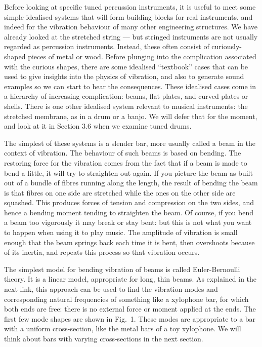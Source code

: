 

  Before looking at specific tuned percussion instruments, it is useful to meet 
  some simple idealised systems that will form building blocks for real 
  instruments, and indeed for the vibration behaviour of many other engineering 
  structures. We have already looked at the stretched string --- but stringed 
  instruments are not usually regarded as percussion instruments. Instead, 
  these often consist of curiously-shaped pieces of metal or wood. Before 
  plunging into the complication associated with the curious shapes, there are 
  some idealised ``textbook'' cases that can be used to give insights into the 
  physics of vibration, and also to generate sound examples so we can start to 
  hear the consequences. These idealised cases come in a hierarchy of 
  increasing complication: beams, flat plates, and curved plates or shells. 
  There is one other idealised system relevant to musical instruments: the 
  stretched membrane, as in a drum or a banjo. We will defer that for the 
  moment, and look at it in Section 3.6 when we examine tuned drums. 

  The simplest of these systems is a slender bar, more usually called a beam in 
  the context of vibration. The behaviour of such beams is based on bending. 
  The restoring force for the vibration comes from the fact that if a beam is 
  made to bend a little, it will try to straighten out again. If you picture 
  the beam as built out of a bundle of fibres running along the length, the 
  result of bending the beam is that fibres on one side are stretched while the 
  ones on the other side are squashed. This produces forces of tension and 
  compression on the two sides, and hence a bending moment tending to 
  straighten the beam. Of course, if you bend a beam too vigorously it may 
  break or stay bent: but this is not what you want to happen when using it to 
  play music. The amplitude of vibration is small enough that the beam springs 
  back each time it is bent, then overshoots because of its inertia, and 
  repeats this process so that vibration occurs. 

  The simplest model for bending vibration of beams is called Euler-Bernoulli 
  theory. It is a linear model, appropriate for long, thin beams. As explained 
  in the next link, this approach can be used to find the vibration modes and 
  corresponding natural frequencies of something like a xylophone bar, for 
  which both ends are free: there is no external force or moment applied at the 
  ends. The first few mode shapes are shown in Fig.\ 1. These modes are 
  appropriate to a bar with a uniform cross-section, like the metal bars of a 
  toy xylophone. We will think about bars with varying cross-sections in the 
  next section. 

